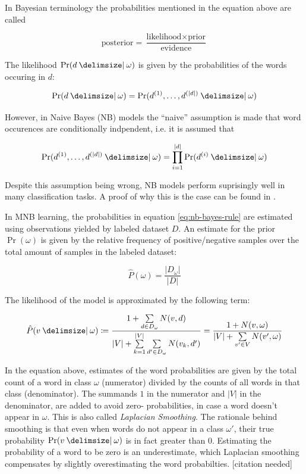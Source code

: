 In Bayesian terminology the probabilities mentioned in the equation above
are called

\begin{equation*}
	\text{posterior} = \frac{\text{likelihood}\times\text{prior}}{\text{evidence}}
\end{equation*}

The likelihood $\Pr(d\given \omega)$ is given by the
probabilities of the words occuring in $d$:

\begin{equation}
\label{eq:likelihood-full}
\Pr(d\given\omega) = \Pr(d^{(1)},\ldots,d^{(|d|)}\given\omega)
\end{equation}

However, in Naive Bayes (NB) models the ``naive'' assumption is made that word
occurences are conditionally indpendent, i.e. it is assumed that

\begin{equation*}
\label{eq:naive-bayes-assumption}
\Pr(d^{(1)},\ldots,d^{(|d|)}\given\omega) = \prod\limits_{i=1}^{|d|}
\Pr(d^{(i)} \given \omega)
\end{equation*}

Despite this assumption being wrong, NB models perform suprisingly
well in many classification tasks. A proof of why this is
the case can be found in \cite{zhang2004optimality}.

In MNB learning, the probabilities in equation \ref{eq:nb-bayes-rule} are
estimated using observations yielded by labeled dataset $D$. 
An estimate for the prior $\Pr(\omega)$ is given by the
relative frequency of positive/negative samples over the total amount of
samples in the labeled dataset:

\begin{equation}
\label{eq:priors}
\hat{P}(\omega) = \frac{|D_\omega|}{|D|}
\end{equation}

The likelihood of the model is approximated by the following term:

\begin{equation}
\label{eq:estimate-word-prob}
\hat{P}(v \given \omega) \coloneqq \frac{1+\sum\limits_{d \in
D_\omega}N(v,d)}{|V| + \sum\limits_{k=1}^{|V|} \sum\limits_{d' \in D_\omega}
N(v_k,d')} = \frac{1 + N(v,\omega)}{|V| + \sum\limits_{v' \in V} N(v', \omega)}
\end{equation}

In the equation above, estimates of the word probabilities are given by the
total count of a word in class $\omega$ (numerator) divided by the counts of all
words in that class (denominator). The summands $1$ in the numerator and $|V|$
in the denominator, are added to avoid zero- probabilities, in case a word
doesn't appear in $\omega$. This is also called \emph{Laplacian Smoothing}. The
rationale behind smoothing is that even when words do not appear in a
class $\omega'$, their true probability $\Pr(v \given \omega)$ is in fact
greater than 0.
Estimating the probability of a word to be zero is an underestimate, which
Laplacian smoothing compensates by slightly overestimating the word probabilties. 
[citation needed]

